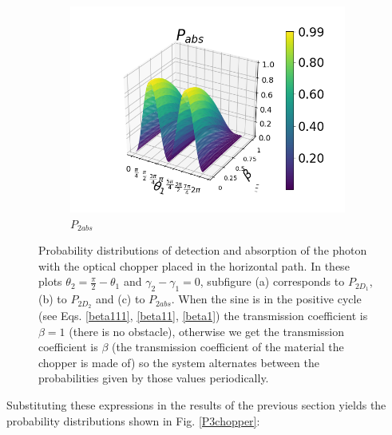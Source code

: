 \documentclass[12pt]{book}
\begin{document}
\begin{figure}[t!]
\begin{subfigure}[b]{0.4\linewidth}
\includegraphics[width=\linewidth]{images/PAbs_v.png}
\caption{$P_{2abs}$}
\label{fig:BS1}
\end{subfigure}
\caption{Probability distributions of detection and absorption of the photon with the optical chopper placed in the horizontal path. In these plots $\theta_{2}=\frac{\pi}{2}-\theta_{1}$ and $\gamma_{2}-\gamma_{1}=0$, subfigure (a) corresponds to $P_{2D_{1}}$, (b) to $P_{2D_{2}}$ and (c) to $P_{2abs}$. When the sine is in the positive cycle (see Eqs. \ref{beta111}, \ref{beta11}, \ref{beta1}) the transmission coefficient is $\beta=1$ (there is no obstacle), otherwise we get the transmission coefficient is $\beta$ (the transmission coefficient of the material the chopper is made of) so the system alternates between the probabilities given by those values periodically.}
\label{P4chopper}
\end{figure}

Substituting these expressions in the results of the previous section yields the probability distributions shown in Fig. \ref{P3chopper}:
\end{document}
